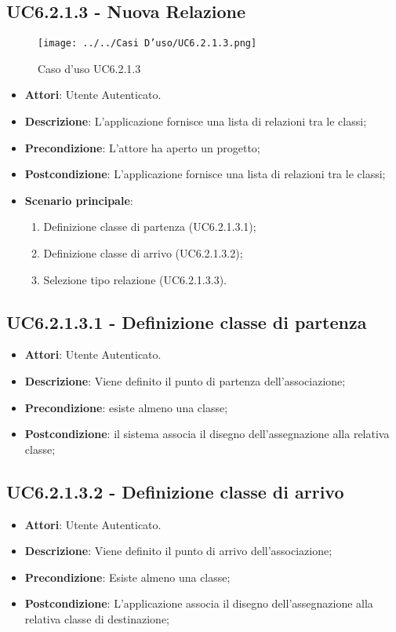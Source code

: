 \subsection{UC6.2.1.3 - Nuova Relazione} 
\label{ssec:UC6.2.1.3} 
\begin{figure}[h!] 
\centering 
\texttt{[image: ../../Casi D'uso/UC6.2.1.3.png]} 
\caption{Caso d'uso UC6.2.1.3} 
 \end{figure} 
\begin{itemize} 
\item \textbf{Attori}: Utente Autenticato.
\item \textbf{Descrizione}: L'applicazione fornisce una lista di relazioni tra le classi;
\item \textbf{Precondizione}: L'attore ha aperto un progetto;
\item \textbf{Postcondizione}: L'applicazione fornisce una lista di relazioni tra le classi;
\item \textbf{Scenario principale}: \begin{enumerate}\item Definizione classe di partenza (UC6.2.1.3.1);\item Definizione classe di arrivo (UC6.2.1.3.2);\item Selezione tipo relazione (UC6.2.1.3.3). 
 \end{enumerate}
\end{itemize} 
\subsection{UC6.2.1.3.1 - Definizione classe di partenza} 
\label{ssec:UC6.2.1.3.1} 
\begin{itemize} 
\item \textbf{Attori}: Utente Autenticato.
\item \textbf{Descrizione}: Viene definito il punto di partenza dell'associazione;
\item \textbf{Precondizione}: esiste almeno una classe;
\item \textbf{Postcondizione}: il sistema associa il disegno dell'assegnazione alla relativa classe;
\end{itemize} 
\subsection{UC6.2.1.3.2 - Definizione classe di arrivo} 
\label{ssec:UC6.2.1.3.2} 
\begin{itemize} 
\item \textbf{Attori}: Utente Autenticato.
\item \textbf{Descrizione}: Viene definito il punto di arrivo dell'associazione;
\item \textbf{Precondizione}: Esiste almeno una classe;
\item \textbf{Postcondizione}: L'applicazione associa il disegno dell'assegnazione alla relativa classe di destinazione;
\end{itemize} 
